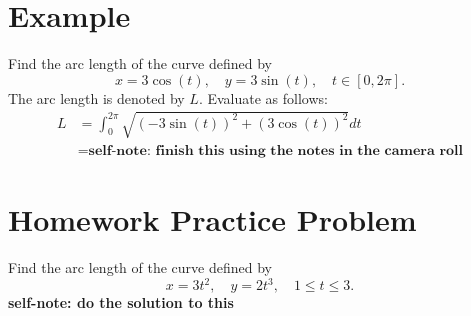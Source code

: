 \documentclass{article}
\begin{document}
\section*{Example}
\begin{examplebox}
    Find the arc length of the curve defined by
    \[
        x = 3\cos(t), \quad y = 3\sin(t), \quad t \in [0, 2\pi] \text{.}
    \]
    The arc length is denoted by \( L \). Evaluate as follows:
    \begin{equation*}
        \begin{aligned}
            L &= \int_{0}^{2\pi} \sqrt{(-3\sin(t))^2 + (3\cos(t))^2} dt \\
            &= \textbf{self-note: finish this using the notes in the camera roll}
        \end{aligned}
    \end{equation*}
\end{examplebox}

\section*{Homework Practice Problem}
\begin{notebox}
    Find the arc length of the curve defined by
    \[
        x = 3t^2, \quad y = 2t^3, \quad 1 \leq t \leq 3 \text{.}
    \]
    \textbf{self-note: do the solution to this} \\
    \\
\end{notebox}
\end{document}

